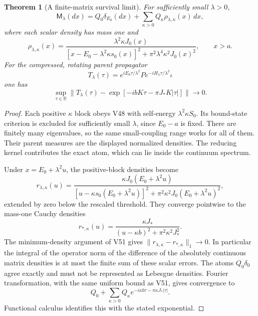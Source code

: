 \documentclass[11pt]{article}
\newtheorem{theorem}{Theorem}[section]
\theoremstyle{remark}
\begin{document}
\begin{theorem}[A finite-matrix survival limit]
\label{thm:v20v52-limit}
For sufficiently small \(\lambda>0\),
\[
 \mathsf M_\lambda(dx)=Q_0\delta_{E_0}(dx)
            +\sum_{\kappa>0}Q_\kappa\rho_{\lambda,\kappa}(x)\,dx,
\]
where each scalar density has mass one and
\[
 \rho_{\lambda,\kappa}(x)=
 \frac{\lambda^2\kappa J_0(x)}
 {[x-E_0-\lambda^2\kappa s_0(x)]^2+
                       \pi^2\lambda^4\kappa^2J_0(x)^2},
 \qquad x>a.
\]
For the compressed, rotating parent propagator
\[
 T_\lambda(\tau)=e^{iE_0\tau/\lambda^2}
               P e^{-iH_\lambda\tau/\lambda^2}\iota
\]
one has
\[
 \sup_{\tau\in\mathbb R}
 \big\|T_\lambda(\tau)
       -\exp[-ibK\tau-\pi J_*K|\tau|]\big\|\longrightarrow0 .
\]
\end{theorem}
\begin{proof}
Each positive \(\kappa\) block obeys V48 with self-energy
\(\lambda^2\kappa S_0\).  Its bound-state criterion is excluded
for sufficiently small \(\lambda\), since \(E_0-a\) is fixed.
There are finitely many eigenvalues, so the same small-coupling
range works for all of them.  Their parent measures are the
displayed normalized densities.  The reducing kernel contributes
the exact atom, which can lie inside the continuum spectrum.

Under \(x=E_0+\lambda^2u\), the positive-block densities become
\[
 r_{\lambda,\kappa}(u)=
 \frac{\kappa J_0(E_0+\lambda^2u)}
 {[u-\kappa s_0(E_0+\lambda^2u)]^2+
               \pi^2\kappa^2J_0(E_0+\lambda^2u)^2},
\]
extended by zero below the rescaled threshold.  They converge
pointwise to the mass-one Cauchy densities
\[
 r_{*,\kappa}(u)=
 \frac{\kappa J_*}{(u-\kappa b)^2+\pi^2\kappa^2J_*^2}.
\]
The minimum-density argument of V51 gives
\(\|r_{\lambda,\kappa}-r_{*,\kappa}\|_1\to0\).
In particular the integral of the operator norm of the difference
of the absolutely continuous matrix densities is at most the
finite sum of these scalar errors.  The atoms \(Q_0\delta_0\)
agree exactly and must not be represented as Lebesgue densities.
Fourier transformation, with the same uniform bound as V51,
gives convergence to
\[
 Q_0+\sum_{\kappa>0}
      Q_\kappa e^{-i\kappa b\tau-\pi\kappa J_*|\tau|}.
\]
Functional calculus identifies this with the stated exponential.
\end{proof}
\end{document}
